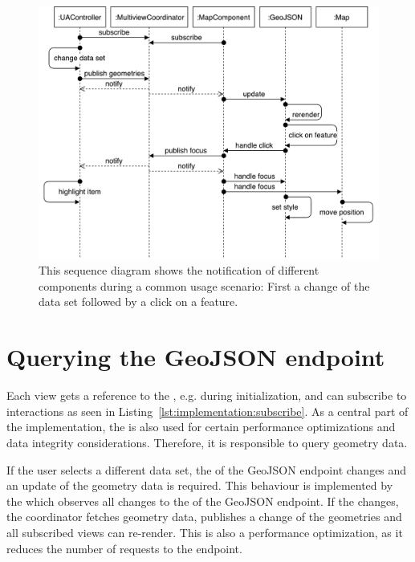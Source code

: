 \begin{figure}[ht]
  \centering
  \includegraphics[width=\textwidth]{figures/implementation/SequenceDiagram}
  \caption{%
    This sequence diagram shows the notification of different components during a common usage scenario:
    First a change of the data set followed by a click on a feature.
  }\label{fig:implementation:sequence-diagram}
\end{figure}


\section{Querying the GeoJSON endpoint}

Each view gets a reference to the , e.g. during initialization, and can subscribe to interactions as seen in Listing~\ref{lst:implementation:subscribe}.
As a central part of the implementation, the  is also used for certain performance optimizations and data integrity considerations.
Therefore, it is responsible to query geometry data.

If the user selects a different data set, the  of the GeoJSON endpoint changes and an update of the geometry data is required.
This behaviour is implemented by the  which observes all changes to the  of the GeoJSON endpoint.
If the  changes, the coordinator fetches geometry data, publishes a change of the geometries and all subscribed views can re-render.
This is also a performance optimization, as it reduces the number of requests to the  endpoint.


